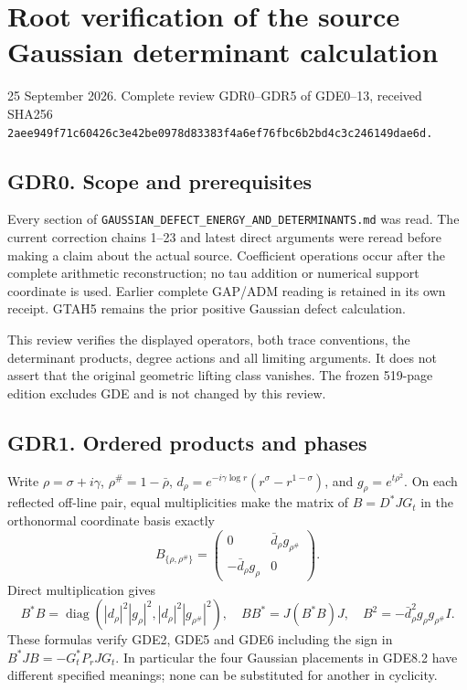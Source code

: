 \section{Root verification of the source Gaussian determinant
calculation}\label{root-verification-of-the-source-gaussian-determinant-calculation}

25 September 2026. Complete review GDR0--GDR5 of GDE0--13, received
SHA256
\nolinkurl{2aee949f71c60426c3e42be0978d83383f4a6ef76fbc6b2bd4c3c246149dae6d.}

\subsection{GDR0. Scope and
prerequisites}\label{gdr0.-scope-and-prerequisites}

Every section of \nolinkurl{GAUSSIAN_DEFECT_ENERGY_AND_DETERMINANTS.md}
was read. The current correction chains 1--23 and latest direct
arguments were reread before making a claim about the actual source.
Coefficient operations occur after the complete arithmetic
reconstruction; no tau addition or numerical support coordinate is used.
Earlier complete GAP/ADM reading is retained in its own receipt. GTAH5
remains the prior positive Gaussian defect calculation.

This review verifies the displayed operators, both trace conventions,
the determinant products, degree actions and all limiting arguments. It
does not assert that the original geometric lifting class vanishes. The
frozen 519-page edition excludes GDE and is not changed by this review.

\subsection{GDR1. Ordered products and
phases}\label{gdr1.-ordered-products-and-phases}

Write \(\rho=\sigma+i\gamma\), \(\rho^\#=1-\bar\rho\),
\(d_\rho=e^{-i\gamma\log r}(r^\sigma-r^{1-\sigma})\), and
\(g_\rho=e^{t\rho^2}\). On each reflected off-line pair, equal
multiplicities make the matrix of \(B=D^*JG_t\) in the orthonormal
coordinate basis exactly \[
B_{\{\rho,\rho^\#\}}=
\begin{pmatrix}0&\bar d_\rho g_{\rho^\#}\\-\bar d_\rho g_\rho&0\end{pmatrix}.
\tag{GDR1.1}
\] Direct multiplication gives \[
B^*B=\operatorname{diag}(|d_\rho|^2|g_\rho|^2,
|d_\rho|^2|g_{\rho^\#}|^2),\quad
BB^*=J(B^*B)J,\quad B^2=-\bar d_\rho^2g_\rho g_{\rho^\#}I.
\tag{GDR1.2}
\] These formulas verify GDE2, GDE5 and GDE6 including the sign in
\(B^*JB=-G_t^*P_rJG_t\). In particular the four Gaussian placements in
GDE8.2 have different specified meanings; none can be substituted for
another in cyclicity.


